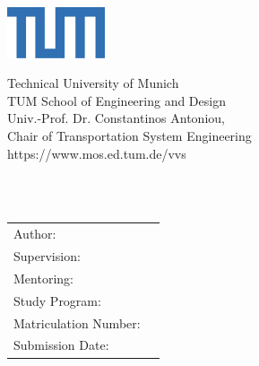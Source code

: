 
\begin{titlepage}
\begin{flushright}
    \includegraphics[height=15mm]{DefaultTemplate/Logos/TUM1.png}
\end{flushright}
    
\vspace{-25.5mm}
\begin{flushleft}
    \footnotesize{%
    Technical University of Munich\\
    TUM School of Engineering and Design\\
    Univ.-Prof. Dr. Constantinos Antoniou, \\
    Chair of Transportation System Engineering\\
    https://www.mos.ed.tum.de/vvs
    }
\end{flushleft}
\vspace{10mm}

\begin{flushleft}
  \vspace{30mm}
  {\huge\bfseries\getTitle{}}\\  
   \vspace{10mm}
   {\Large\bfseries\getsubTitle{}}\\  
  
  \vspace{80mm}

    \begin{tabular}{l l}
Author:                     &\getAuthor{} \\
Supervision:                &\getSupervisor{} \\
Mentoring:                  &\getMentor{}\\
Study Program:              &\getCourseofStudy{} \\
Matriculation Number:       &\getAuthorMatrNr{}\\
Submission Date:            &\getSubmissionDate{} \\
    \end{tabular}
\end{flushleft}

\end{titlepage}
